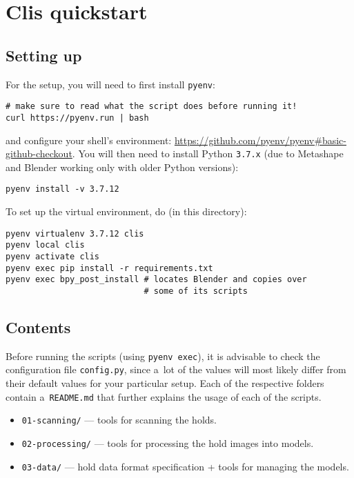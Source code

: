 \chapter{Clis quickstart}\label{apx:clis}

\section{Setting up}\label{apx:clissetup}

For the setup, you will need to first install \texttt{pyenv}:
\begin{verbatim}
# make sure to read what the script does before running it!
curl https://pyenv.run | bash
\end{verbatim}
and configure your shell's environment: \url{https://github.com/pyenv/pyenv\#basic-github-checkout}.
You will then need to install Python \texttt{3.7.x} (due to Metashape and Blender working only with older Python versions):

\begin{verbatim}
pyenv install -v 3.7.12
\end{verbatim}

To set up the virtual environment, do (in this directory):

\begin{verbatim}
pyenv virtualenv 3.7.12 clis
pyenv local clis
pyenv activate clis
pyenv exec pip install -r requirements.txt
pyenv exec bpy_post_install # locates Blender and copies over
                            # some of its scripts
\end{verbatim}

\section{Contents}

Before running the scripts (using \texttt{pyenv exec}), it is advisable
to check the configuration file \texttt{config.py}, since a~lot of the values will most likely
differ from their default values for your particular setup. Each of the
respective folders contain a~\texttt{README.md} that further explains
the usage of each of the scripts.

\begin{itemize}
	\item \texttt{01-scanning/} --- tools for scanning the holds.
	\item \texttt{02-processing/} --- tools for processing the hold images into models.
	\item \texttt{03-data/} --- hold data format specification + tools for managing the models.
\end{itemize}

